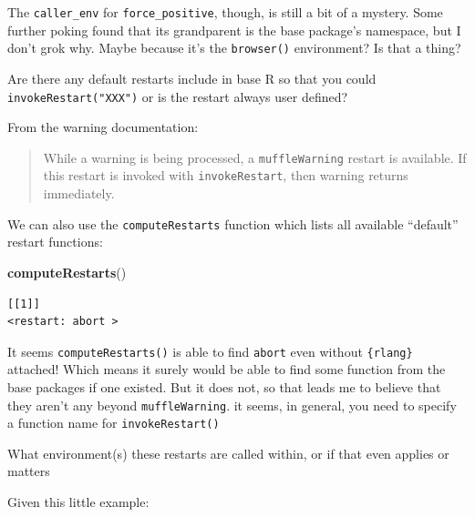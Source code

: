 \documentclass[]{book}
\newenvironment{Shaded}{\begin{snugshade}}{\end{snugshade}}
\newcommand{\KeywordTok}[1]{\textcolor[rgb]{0.13,0.29,0.53}{\textbf{#1}}}
\newcommand{\NormalTok}[1]{#1}
\begin{document}
The \texttt{caller\_env} for \texttt{force\_positive}, though, is still a bit of a mystery. Some further poking found that its grandparent is the base package's namespace, but I don't grok why. Maybe because it's the \texttt{browser()} environment? Is that a thing?

Are there any default restarts include in base R so that you could \texttt{invokeRestart("XXX")} or is the restart always user defined?

From the warning documentation:

\begin{quote}
While a warning is being processed, a \texttt{muffleWarning} restart is available. If this restart is invoked with \texttt{invokeRestart}, then warning returns immediately.
\end{quote}

We can also use the \texttt{computeRestarts} function which lists all available ``default'' restart functions:

\begin{Shaded}
\begin{Highlighting}[]
\KeywordTok{computeRestarts}\NormalTok{()}
\end{Highlighting}
\end{Shaded}

\begin{verbatim}
[[1]]
<restart: abort >
\end{verbatim}

It seems \texttt{computeRestarts()} is able to find \texttt{abort} even without \texttt{\{rlang\}} attached! Which means it surely would be able to find some function from the base packages if one existed. But it does not, so that leads me to believe that they aren't any beyond \texttt{muffleWarning}. it seems, in general, you need to specify a function name for \texttt{invokeRestart()}

What environment(s) these restarts are called within, or if that even applies or matters

Given this little example:
\end{document}

